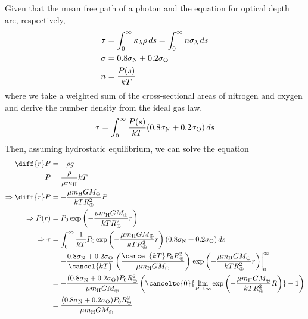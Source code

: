 \documentclass{article}
\begin{document}
\subsection{}

Given that the mean free path of a photon and the equation for optical depth are, respectively,
\begin{align}
    \tau &= \int_0^\infty \kappa_\lambda \rho \, ds = \int_0^\infty n \sigma_\lambda \, ds \\
    \sigma &= 0.8 \sigma_{\ce{N}} + 0.2 \sigma_{\ce{O}} \\
    n &= \frac{P(s)}{kT}
\end{align}
where we take a weighted sum of the cross-sectional areas of nitrogen and oxygen and derive the number density from the ideal gas law,
\begin{equation}
    \tau = \int_0^\infty \frac{P(s)}{kT} (0.8 \sigma_{\ce{N}} + 0.2 \sigma_{\ce{O}}) \, ds
\end{equation}
Then, assuming hydrostatic equilibrium, we can solve the equation
\begin{align}
    \diff{r} P &= -\rho g \\
    P &= \frac{\rho}{\mu m_{\ce{H}}} kT \\
    \Rightarrow \diff{r} P &= -\frac{\mu m_{\ce{H}} G M_\oplus}{kT R_\oplus^2} P \\
    \Rightarrow P(r) &= P_0 \exp\left(-\frac{\mu m_{\ce{H}} G M_\oplus}{kT R_\oplus^2} r\right) \\
    \Rightarrow \tau &= \int_0^\infty \frac{1}{kT} P_0 \exp\left(-\frac{\mu m_{\ce{H}} G M_\oplus}{kT R_\oplus^2} r\right) (0.8 \sigma_{\ce{N}} + 0.2 \sigma_{\ce{O}}) \, ds \\
    &= -\frac{0.8\sigma_{\ce{N}} + 0.2\sigma_{\ce{O}}}{\cancel{kT}} \left(\frac{\cancel{kT} P_0 R_\oplus^2}{\mu m_{\ce{H}} G M_\oplus}\right) \left.\exp\left(-\frac{\mu m_{\ce{H}} G M_\oplus}{kT R_\oplus^2} r\right) \right|_0^\infty \\
    &= -\frac{(0.8\sigma_{\ce{N}} + 0.2\sigma_{\ce{O}}) P_0 R_\oplus^2}{\mu m_{\ce{H}} G M_\oplus} \left(\cancelto{0}{\lim_{R \to \infty} \exp\left(-\frac{\mu m_{\ce{H}} G M_\oplus}{kT R_\oplus^2} R\right)} - 1\right) \\
    &= \frac{(0.8\sigma_{\ce{N}} + 0.2\sigma_{\ce{O}}) P_0 R_\oplus^2}{\mu m_{\ce{H}} G M_\oplus}
\end{align}

\subsection{}
\end{document}

